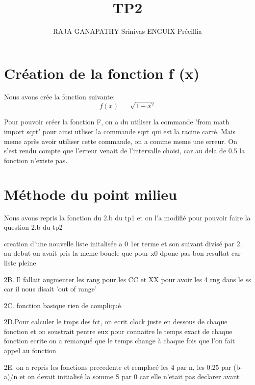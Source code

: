 \documentclass{article}
\title{TP2}
\author{RAJA GANAPATHY Srinivas ENGUIX Précillia}
\begin{document}
\maketitle
        
\section{Création de la fonction f (x)}

        Nous avons crée la fonction suivante:
$$f(x) = \sqrt[]{1 - x^2} $$

Pour pouvoir créer la fonction F, on a du utiliser la commande 'from math import sqrt' pour ainsi utliser la commande sqrt qui est la racine carré.
Mais meme après avoir utiliser cette commande, on a comme meme une erreur.
On s'est rendu compte que l'erreur venait de l'intervalle choisi, car au dela de 0.5 la fonction n'existe pas.

\section{Méthode du point milieu}

Nous avons repris la fonction du 2.b du tp1 et on l'a modifié pour pouvoir faire la question 2.b du tp2

creation d'une nouvelle liste initalisée a 0
1er terme et son suivant divisé par 2..
au debut on avait pris la meme boucle que pour x0 dponc pas bon resultat car liste pleine


2B. Il fallait augmenter les rang pour les CC et XX pour avoir les 4 rng dans le ss car il nous disait 'out of range'

2C. fonction basique rien de compliqué.

2D.Pour calculer le tmps des fct, on ecrit clock juste en dessous de chaque fonction et on soustrait pentre eux pour connaitre le temps exact de chaque fonction ecrite on a remarqué que le temps change à chaque fois que l'on fait appel au fonction

2E. on a repris les fonctions precedente et remplacé les 4 par n, les 0.25 par (b-a)/n
et on devait initialisé la somme S par 0 car elle n'etait pas declarer avant
\end{document}
